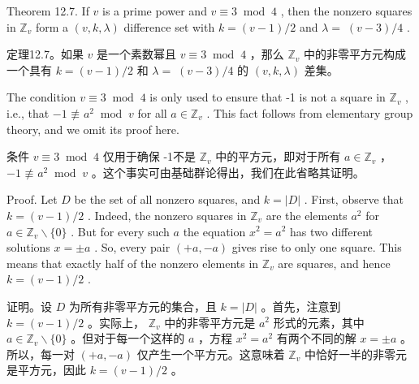 \documentclass[10pt]{article}
\begin{document}
Theorem 12.7. If \(v\) is a prime power and \(v \equiv  3{\;\operatorname{mod}\;4}\) , then the nonzero squares in \({\mathbb{Z}}_{v}\) form a \(\left( {v,k,\lambda }\right)\) difference set with \(k = \left( {v - 1}\right) /2\) and \(\lambda  = \; \left( {v - 3}\right) /4\) .

\begin{tcolorbox}\relax
定理12.7。如果 \(v\) 是一个素数幂且 \(v \equiv  3{\;\operatorname{mod}\;4}\) ，那么 \({\mathbb{Z}}_{v}\) 中的非零平方元构成一个具有 \(k = \left( {v - 1}\right) /2\) 和 \(\lambda  = \; \left( {v - 3}\right) /4\) 的 \(\left( {v,k,\lambda }\right)\) 差集。
\end{tcolorbox}

The condition \(v \equiv  3{\;\operatorname{mod}\;4}\) is only used to ensure that -1 is not a square in \({\mathbb{Z}}_{v}\) , i.e., that \(- 1 \text{ ≢ } {a}^{2}{\;\operatorname{mod}\;v}\) for all \(a \in  {\mathbb{Z}}_{v}\) . This fact follows from elementary group theory, and we omit its proof here.

\begin{tcolorbox}\relax
条件 \(v \equiv  3{\;\operatorname{mod}\;4}\) 仅用于确保 -1不是 \({\mathbb{Z}}_{v}\) 中的平方元，即对于所有 \(a \in  {\mathbb{Z}}_{v}\) ， \(- 1 \text{ ≢ } {a}^{2}{\;\operatorname{mod}\;v}\) 。这个事实可由基础群论得出，我们在此省略其证明。
\end{tcolorbox}

Proof. Let \(D\) be the set of all nonzero squares, and \(k = \left| D\right|\) . First, observe that \(k = \left( {v - 1}\right) /2\) . Indeed, the nonzero squares in \({\mathbb{Z}}_{v}\) are the elements \({a}^{2}\) for \(a \in  {\mathbb{Z}}_{v} \smallsetminus  \{ 0\}\) . But for every such \(a\) the equation \({x}^{2} = {a}^{2}\) has two different solutions \(x =  \pm  a\) . So, every pair \(\left( {+a, - a}\right)\) gives rise to only one square. This means that exactly half of the nonzero elements in \({\mathbb{Z}}_{v}\) are squares, and hence \(k = \left( {v - 1}\right) /2\) .

\begin{tcolorbox}\relax
证明。设 \(D\) 为所有非零平方元的集合，且 \(k = \left| D\right|\) 。首先，注意到 \(k = \left( {v - 1}\right) /2\) 。实际上， \({\mathbb{Z}}_{v}\) 中的非零平方元是 \({a}^{2}\) 形式的元素，其中 \(a \in  {\mathbb{Z}}_{v} \smallsetminus  \{ 0\}\) 。但对于每一个这样的 \(a\) ，方程 \({x}^{2} = {a}^{2}\) 有两个不同的解 \(x =  \pm  a\) 。所以，每一对 \(\left( {+a, - a}\right)\) 仅产生一个平方元。这意味着 \({\mathbb{Z}}_{v}\) 中恰好一半的非零元是平方元，因此 \(k = \left( {v - 1}\right) /2\) 。
\end{tcolorbox}
\end{document}
